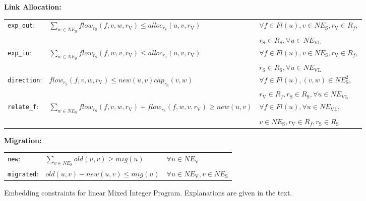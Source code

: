 \documentclass[conference,10pt]{IEEEtran}
\newcommand{\mrm}{\mathrm}
\begin{document}
\begin{figure*} [tb!]
\begin{scriptsize}
\vspace*{1mm}

\noindent \textbf{\normalsize Link Allocation:}

\vspace{1mm}

\begin{tabular}{lll}
  \texttt{exp\_out}: & $\sum_{w \in NE_\mrm{S}} flow_{r_\mrm{S}}(f,v,w,r_\mrm{V})\leq alloc_{r_\mrm{S}}(u,v,r_\mrm{V})$ & $\forall f \in Fl(u), v \in NE_\mrm{S}, r_\mrm{V} \in R_f,$\\
	& & $r_\mrm{S} \in R_\mrm{S}, \forall u \in NE_{\mrm{VL}}$ \\
\texttt{exp\_in}: & $\sum_{w \in NE_\mrm{S}} flow_{r_\mrm{S}}(f,w,v,r_\mrm{V})\leq alloc_{r_\mrm{S}}(u,v,r_\mrm{V})$ & $\forall f \in Fl(u), v \in NE_\mrm{S}, r_\mrm{V} \in R_f,$\\
	& & $r_\mrm{S} \in R_\mrm{S}, \forall u \in NE_{\mrm{VL}}$ \\   \texttt{direction}: & $flow_{r_\mrm{S}}(f,v,w,r_\mrm{V})\leq new(u,v)cap_{r_\mrm{S}}(v,w)$ & $\forall f \in Fl(u), (v,w) \in NE_\mrm{S}^2,$\\
	& & $r_\mrm{V} \in R_f, r_\mrm{S} \in R_\mrm{S},  \forall u \in NE_{\mrm{VL}}$ \\
  \texttt{relate\_f}: & $\sum_{w \in NE_\mrm{S}} flow_{r_\mrm{S}}(f,v,w,r_\mrm{V})+ flow_{r_\mrm{S}}(f,w,v,r_\mrm{V})\geq  new(u,v)$ & $\forall f \in Fl(u), \forall u \in NE_{\mrm{VL}},$\\
	& & $v \in NE_\mrm{S}, r_\mrm{V} \in R_f, r_\mrm{S} \in R_\mrm{S}$ \\
\end{tabular}

\vspace*{1mm}

\noindent \textbf{\normalsize Migration:}

\vspace*{1mm}

\begin{tabular}{l l l}
  \texttt{new}: & $\sum_{v \in NE_\mrm{S}} old(u,v)\geq mig(u)$ & $\forall u \in NE_\mrm{V}$ \\
  \texttt{migrated}: & $old(u,v)-new(u,v)\leq mig(u)$ & $\forall u \in NE_\mrm{V}, v \in NE_\mrm{S}$
\end{tabular}
\end{scriptsize}
\begin{center}
\caption{Embedding constraints for linear Mixed Integer Program.
Explanations are given in the text.}\label{fig:constraints}
\end{center}
\end{figure*}
\end{document}
